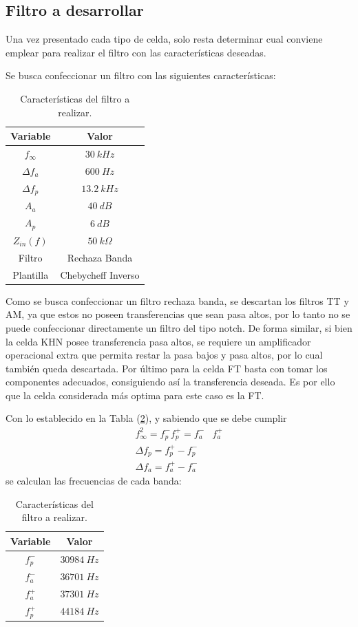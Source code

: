 \subsection{Filtro a desarrollar}
Una vez presentado cada tipo de celda, solo resta determinar cual conviene emplear para realizar el filtro con las características deseadas.

Se busca confeccionar un filtro con las siguientes características:
\begin{table}[H]
\centering
\begin{tabular}{cc}
\hline
\textbf{Variable} & \textbf{Valor} \\
\hline
$f_\infty$ & $30 \ kHz$ \\
$\Delta f_a$ & $600 \ Hz$ \\
$\Delta f_p$ & $13.2 \ kHz$ \\
$A_a$ & $40 \ dB$ \\
$A_p$ & $6 \ dB$ \\
$Z_{in}(f)$ & $50 \ k\Omega$ \\
Filtro & Rechaza Banda \\
Plantilla & Chebycheff Inverso \\
\hline
\end{tabular}
\caption{Características del filtro a realizar.}
\label{tabla:caracteristicas}
\end{table}

Como se busca confeccionar un filtro rechaza banda, se descartan los filtros TT y AM, ya que estos no poseen transferencias que sean pasa altos, por lo tanto no se puede confeccionar directamente un filtro del tipo notch. De forma similar, si bien la celda KHN posee transferencia pasa altos, se requiere un amplificador operacional extra que permita restar la pasa bajos y pasa altos, por lo cual también queda descartada. Por último para la celda FT basta con tomar los componentes adecuados, consiguiendo así la transferencia deseada. Es por ello que la celda considerada más optima para este caso es la FT.

Con lo establecido en la Tabla (\ref{tabla:caracteristicas}), y sabiendo que se debe cumplir
\begin{equation}
\begin{split}
	f_{\infty}^{2} = f_{p}^{-} f_{p}^{+} = f_{a}^{-} & f_{a}^{+} \\
	\Delta f_p = f_{p}^{+} - f_{p}^{-} \\
	\Delta f_a = f_{a}^{+} - f_{a}^{-} 
\end{split}
\end{equation}
se calculan las frecuencias de cada banda:
\begin{table}[H]
\centering
\begin{tabular}{cc}
\hline
\textbf{Variable} & \textbf{Valor} \\
\hline
$f_{p}^{-}$ & $30984 \ Hz$ \\
$f_{a}^{-}$ & $36701 \ Hz$ \\
$f_{a}^{+}$ & $37301 \ Hz$ \\
$f_{p}^{+}$ & $44184\ Hz$ \\
\hline
\end{tabular}
\caption{Características del filtro a realizar.}
\label{tabla:caracteristicas}
\end{table}


